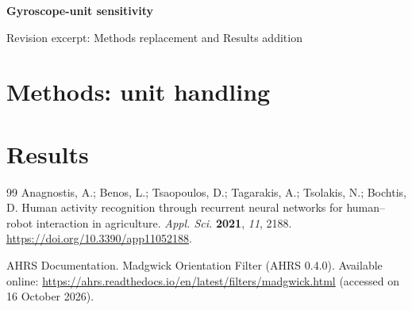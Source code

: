 \documentclass[10pt]{article}
\begin{document}
{\LARGE\bfseries Gyroscope-unit sensitivity}\par
{\small Revision excerpt: Methods replacement and Results addition}\par
\vspace{0.4em}

\section*{Methods: unit handling}


\section*{Results}


\begin{thebibliography}{99}
Anagnostis, A.; Benos, L.; Tsaopoulos, D.; Tagarakis, A.; Tsolakis, N.;
Bochtis, D. Human activity recognition through recurrent neural networks
for human--robot interaction in agriculture.
\textit{Appl. Sci.} \textbf{2021}, \textit{11}, 2188.
\url{https://doi.org/10.3390/app11052188}.

AHRS Documentation. Madgwick Orientation Filter (AHRS 0.4.0).
Available online:
\url{https://ahrs.readthedocs.io/en/latest/filters/madgwick.html}
(accessed on 16 October 2026).
\end{thebibliography}
\end{document}
